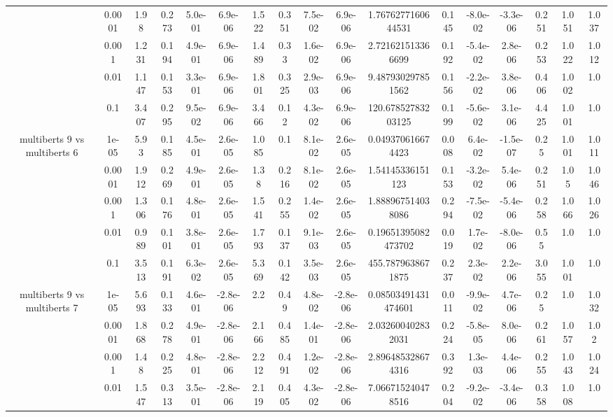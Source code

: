 \begin{tabular}{|c|c|c|c|c|c|c|c|c|c|c|c|c|c|c|c|c|}
 & 0.0001 & 1.98 & 0.273 & 5.0e-01 & 6.9e-06 & 1.522 & 0.351 & 7.5e-02 & 6.9e-06 & 1.7676277160644531 & 0.145 & -8.0e-02 & -3.3e-06 & 0.251 & 1.051 & 1.037 \\
 & 0.001 & 1.231 & 0.194 & 4.9e-01 & 6.9e-06 & 1.489 & 0.33 & 1.6e-02 & 6.9e-06 & 2.721621513366699 & 0.192 & -5.4e-02 & 2.8e-06 & 0.253 & 1.022 & 1.012 \\
 & 0.01 & 1.147 & 0.153 & 3.3e-01 & 6.9e-06 & 1.801 & 0.325 & 2.9e-03 & 6.9e-06 & 9.487930297851562 & 0.156 & -2.2e-02 & 3.8e-06 & 0.406 & 1.002 & 1.0 \\
 & 0.1 & 3.407 & 0.295 & 9.5e-02 & 6.9e-06 & 3.466 & 0.12 & 4.3e-02 & 6.9e-06 & 120.67852783203125 & 0.199 & -5.6e-02 & 3.1e-06 & 4.425 & 1.001 & 1.0 \\
\hline
\multirow{5}{*}{multiberts 9 vs multiberts 6} & 1e-05 & 5.93 & 0.185 & 4.5e-01 & 2.6e-05 & 1.085 & 0.1 & 8.1e-02 & 2.6e-05 & 0.049370616674423 & 0.008 & 6.4e-02 & -1.5e-07 & 0.25 & 1.001 & 1.011 \\
 & 0.0001 & 1.912 & 0.269 & 4.9e-01 & 2.6e-05 & 1.38 & 0.216 & 8.1e-02 & 2.6e-05 & 1.54145336151123 & 0.153 & -3.2e-02 & 5.4e-06 & 0.251 & 1.05 & 1.046 \\
 & 0.001 & 1.306 & 0.176 & 4.8e-01 & 2.6e-05 & 1.541 & 0.255 & 1.4e-02 & 2.6e-05 & 1.888967514038086 & 0.294 & -7.5e-02 & -5.4e-06 & 0.258 & 1.066 & 1.026 \\
 & 0.01 & 0.989 & 0.101 & 3.8e-01 & 2.6e-05 & 1.793 & 0.137 & 9.1e-03 & 2.6e-05 & 0.19651395082473702 & 0.019 & 1.7e-02 & -8.0e-06 & 0.55 & 1.0 & 1.0 \\
 & 0.1 & 3.513 & 0.191 & 6.3e-02 & 2.6e-05 & 5.369 & 0.142 & 3.5e-03 & 2.6e-05 & 455.7879638671875 & 0.237 & 2.3e-02 & 2.2e-06 & 3.055 & 1.001 & 1.0 \\
\hline
\multirow{5}{*}{multiberts 9 vs multiberts 7} & 1e-05 & 5.693 & 0.133 & 4.6e-01 & -2.8e-06 & 2.2 & 0.49 & 4.8e-02 & -2.8e-06 & 0.08503491431474601 & 0.011 & -9.9e-02 & 4.7e-06 & 0.25 & 1.0 & 1.032 \\
 & 0.0001 & 1.868 & 0.278 & 4.9e-01 & -2.8e-06 & 2.166 & 0.485 & 1.4e-01 & -2.8e-06 & 2.032600402832031 & 0.224 & -5.8e-05 & 8.0e-06 & 0.261 & 1.057 & 1.02 \\
 & 0.001 & 1.48 & 0.225 & 4.8e-01 & -2.8e-06 & 2.212 & 0.491 & 1.2e-02 & -2.8e-06 & 2.896485328674316 & 0.392 & 1.3e-03 & 4.4e-06 & 0.255 & 1.043 & 1.024 \\
 & 0.01 & 1.547 & 0.313 & 3.5e-01 & -2.8e-06 & 2.119 & 0.405 & 4.3e-02 & -2.8e-06 & 7.066715240478516 & 0.204 & -9.2e-02 & -3.4e-06 & 0.358 & 1.008 & 1.0 \\

\end{tabular}

